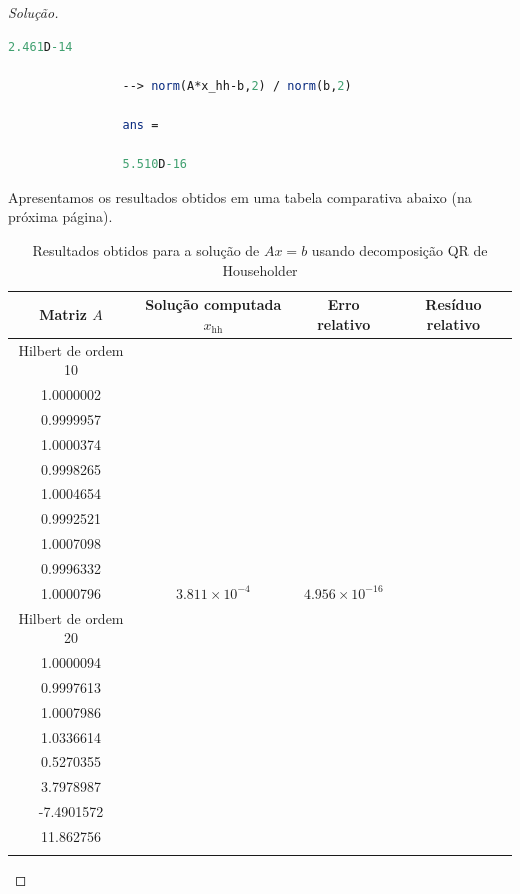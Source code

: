 \documentclass{article}
\begin{document}
\begin{proof}[Solução]
\begin{itemize}
\begin{lstlisting}[language=Scilab, caption={Solução de \(Ax=b\) para \(A\) sendo uma matriz gerada randomicamente de ordem 20}]
                2.461D-14

                --> norm(A*x_hh-b,2) / norm(b,2)

                ans = 

                5.510D-16
            \end{lstlisting}
    \end{itemize}

    Apresentamos os resultados obtidos em uma tabela comparativa abaixo (na próxima página).
    \begin{table}[h]
        \centering
        \caption{Resultados obtidos para a solução de \(Ax=b\) usando decomposição QR de Householder}
        \begin{tabular}{cccc}
            \toprule
            Matriz \(A\) & Solução computada \(x_{\text{hh}}\) & Erro relativo & Resíduo relativo \\
            \midrule
            Hilbert de ordem 10 & \(x_{\text{hh}} = \begin{bmatrix}
                1.0000000 \\
                1.0000002 \\
                0.9999957 \\
                1.0000374 \\
                0.9998265 \\
                1.0004654 \\
                0.9992521 \\
                1.0007098 \\
                0.9996332 \\
                1.0000796
            \end{bmatrix}\) & \(3.811 \times 10^{-4}\) & \(4.956 \times 10^{-16}\) \\
            \addlinespace
            Hilbert de ordem 20 & \(x_{\text{hh}} = \begin{bmatrix}
                0.9999999 \\
                1.0000094 \\
                0.9997613 \\
                1.0007986 \\
                1.0336614 \\
                0.5270355 \\
                3.7978987 \\
                -7.4901572 \\
                11.862756 \\

\end{bmatrix}
\end{tabular}
\end{table}
\end{proof}
\end{document}
